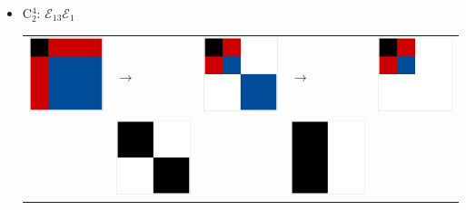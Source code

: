 \documentclass[11pt,dvipsnames]{article} %
\newcommand{\E}{\mathcal{E}}
\newcommand{\1}{\mathds{1}}
\begin{document}
\begin{itemize}
\begin{itemize}
\item C$_2^4$: $\E_{13}\E_1$\newline
\begin{tabular}{m{2cm} m{2cm} m{2cm} m{2cm} m{2cm}}
\includegraphics[width=2.2cm]{img-JA/id}  
& \hspace{0.8cm}$\longrightarrow$ 
& \includegraphics[width=2.2cm]{img-JA/8comp} 
& \hspace{0.8cm}$\longrightarrow$ 
& \includegraphics[width=2.2cm]{C42}\\ 
 & \includegraphics[width=2.2cm]{img-JA/16To8} &  
 & \includegraphics[width=2.2cm]{ruleC81} &\\ 
\end{tabular} 


\end{itemize}
\end{itemize}
\end{document}
